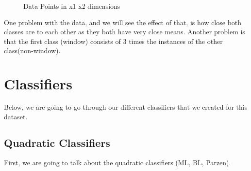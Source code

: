 \documentclass[11pt, oneside]{article}   	%
\begin{document}
\begin{figure}
\begin{center}
\end{center}
\caption{Data Points in x1-x2 dimensions}
\label{fig:data-points}
\end{figure}

One problem with the data, and we will see the effect of that, is how close both classes are to each other as they both have very close means. Another problem is that the first class (window) consists of 3 times the instances of the other class(non-window).

\section*{Classifiers}

Below, we are going to go through our different classifiers that we created for this dataset.

\subsection{Quadratic Classifiers}

First, we are going to talk about the quadratic classifiers (ML, BL, Parzen).
\end{document}

